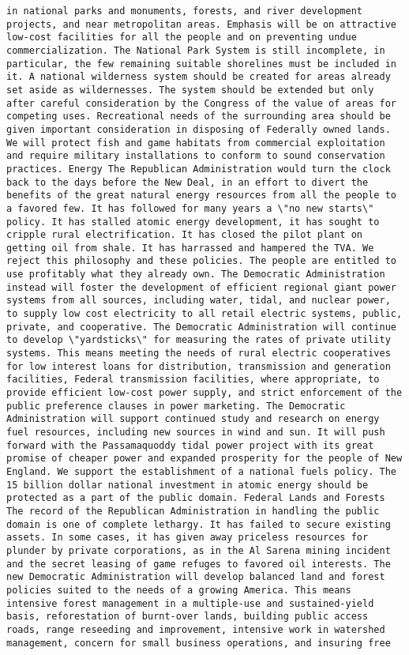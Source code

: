 \documentclass[
]{article}
\begin{document}
\begin{verbatim}
in national parks and monuments, forests, and river development projects, and near metropolitan areas. Emphasis will be on attractive low-cost facilities for all the people and on preventing undue commercialization. The National Park System is still incomplete, in particular, the few remaining suitable shorelines must be included in it. A national wilderness system should be created for areas already set aside as wildernesses. The system should be extended but only after careful consideration by the Congress of the value of areas for competing uses. Recreational needs of the surrounding area should be given important consideration in disposing of Federally owned lands. We will protect fish and game habitats from commercial exploitation and require military installations to conform to sound conservation practices. Energy The Republican Administration would turn the clock back to the days before the New Deal, in an effort to divert the benefits of the great natural energy resources from all the people to a favored few. It has followed for many years a \"no new starts\" policy. It has stalled atomic energy development, it has sought to cripple rural electrification. It has closed the pilot plant on getting oil from shale. It has harrassed and hampered the TVA. We reject this philosophy and these policies. The people are entitled to use profitably what they already own. The Democratic Administration instead will foster the development of efficient regional giant power systems from all sources, including water, tidal, and nuclear power, to supply low cost electricity to all retail electric systems, public, private, and cooperative. The Democratic Administration will continue to develop \"yardsticks\" for measuring the rates of private utility systems. This means meeting the needs of rural electric cooperatives for low interest loans for distribution, transmission and generation facilities, Federal transmission facilities, where appropriate, to provide efficient low-cost power supply, and strict enforcement of the public preference clauses in power marketing. The Democratic Administration will support continued study and research on energy fuel resources, including new sources in wind and sun. It will push forward with the Passamaquoddy tidal power project with its great promise of cheaper power and expanded prosperity for the people of New England. We support the establishment of a national fuels policy. The 15 billion dollar national investment in atomic energy should be protected as a part of the public domain. Federal Lands and Forests The record of the Republican Administration in handling the public domain is one of complete lethargy. It has failed to secure existing assets. In some cases, it has given away priceless resources for plunder by private corporations, as in the Al Sarena mining incident and the secret leasing of game refuges to favored oil interests. The new Democratic Administration will develop balanced land and forest policies suited to the needs of a growing America. This means intensive forest management in a multiple-use and sustained-yield basis, reforestation of burnt-over lands, building public access roads, range reseeding and improvement, intensive work in watershed management, concern for small business operations, and insuring free 
\end{verbatim}
\end{document}
